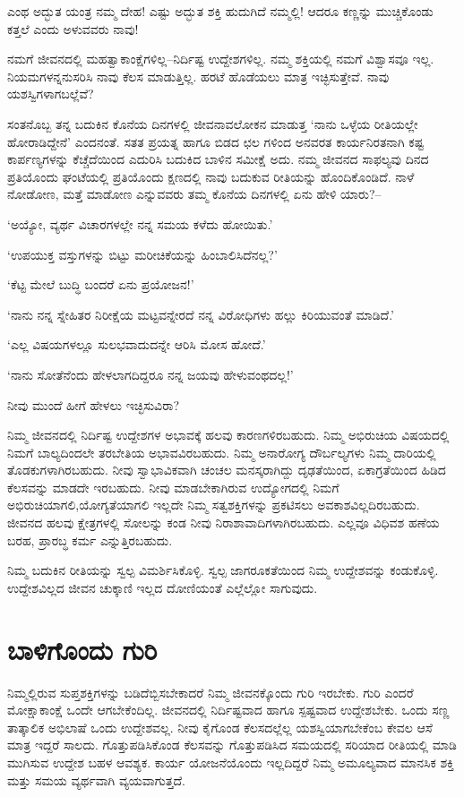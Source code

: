 ಎಂಥ ಅದ್ಭುತ ಯಂತ್ರ ನಮ್ಮ ದೇಹ! ಎಷ್ಟು ಅದ್ಭುತ ಶಕ್ತಿ ಹುದುಗಿದೆ ನಮ್ಮಲ್ಲಿ! ಆದರೂ ಕಣ್ಣನ್ನು ಮುಚ್ಚಿಕೊಂಡು ಕತ್ತಲೆ ಎಂದು ಅಳುವವರು ನಾವು!

ನಮಗೆ ಜೀವನದಲ್ಲಿ ಮಹತ್ವಾಕಾಂಕ್ಷೆಗಳಿಲ್ಲ–ನಿರ್ದಿಷ್ಟ ಉದ್ದೇಶಗಳಿಲ್ಲ. ನಮ್ಮ ಶಕ್ತಿಯಲ್ಲಿ ನಮಗೆ ವಿಶ್ವಾಸವೂ ಇಲ್ಲ. ನಿಯಮಗಳನ್ನನುಸರಿಸಿ ನಾವು ಕೆಲಸ ಮಾಡುತ್ತಿಲ್ಲ. ಹರಟೆ ಹೊಡೆಯಲು ಮಾತ್ರ ಇಚ್ಛಿಸುತ್ತೇವೆ. ನಾವು ಯಶಸ್ವಿಗಳಾಗಬಲ್ಲೆವೆ?

ಸಂತನೊಬ್ಬ ತನ್ನ ಬದುಕಿನ ಕೊನೆಯ ದಿನಗಳಲ್ಲಿ ಜೀವನಾವಲೋಕನ ಮಾಡುತ್ತ ‘ನಾನು ಒಳ್ಳೆಯ ರೀತಿಯಲ್ಲೇ ಹೋರಾಡಿದ್ದೇನೆ’ ಎಂದನಂತೆ. ಸತತ ಪ್ರಯತ್ನ ಹಾಗೂ ಬಿಡದ ಛಲ ಗಳಿಂದ ಅನವರತ ಕಾರ್ಯನಿರತನಾಗಿ ಕಷ್ಟ ಕಾರ್ಪಣ್ಯಗಳನ್ನು ಕೆಚ್ಚೆದೆಯಿಂದ ಎದುರಿಸಿ ಬದುಕಿದ ಬಾಳಿನ ಸಮೀಕ್ಷೆ ಅದು. ನಮ್ಮ ಜೀವನದ ಸಾಫಲ್ಯವು ದಿನದ ಪ್ರತಿಯೊಂದು ಘಂಟೆಯಲ್ಲಿ ಪ್ರತಿಯೊಂದು ಕ್ಷಣದಲ್ಲಿ ನಾವು ಬದುಕುವ ರೀತಿಯನ್ನು ಹೊಂದಿಕೊಂಡಿದೆ. ನಾಳೆ ನೋಡೋಣ, ಮತ್ತೆ ಮಾಡೋಣ ಎನ್ನುವವರು ತಮ್ಮ ಕೊನೆಯ ದಿನಗಳಲ್ಲಿ ಏನು ಹೇಳಿ ಯಾರು?–

‘ಅಯ್ಯೋ, ವ್ಯರ್ಥ ವಿಚಾರಗಳಲ್ಲೇ ನನ್ನ ಸಮಯ ಕಳೆದು ಹೋಯಿತು.’

‘ಉಪಯುಕ್ತ ವಸ್ತುಗಳನ್ನು ಬಿಟ್ಟು ಮರೀಚಿಕೆಯನ್ನು ಹಿಂಬಾಲಿಸಿದೆನಲ್ಲ?’

‘ಕೆಟ್ಟ ಮೇಲೆ ಬುದ್ಧಿ ಬಂದರೆ ಏನು ಪ್ರಯೋಜನ!’

‘ನಾನು ನನ್ನ ಸ್ನೇಹಿತರ ನಿರೀಕ್ಷೆಯ ಮಟ್ಟವನ್ನೇರದೆ ನನ್ನ ವಿರೋಧಿಗಳು ಹಲ್ಲು ಕಿರಿಯು\-ವಂತೆ ಮಾಡಿದೆ.’

‘ಎಲ್ಲ ವಿಷಯಗಳಲ್ಲೂ ಸುಲಭವಾದುದನ್ನೇ ಆರಿಸಿ ಮೋಸ ಹೋದೆ.’

‘ನಾನು ಸೋತೆನೆಂದು ಹೇಳಲಾಗದಿದ್ದರೂ ನನ್ನ ಜಯವು ಹೇಳುವಂಥದಲ್ಲ!’

ನೀವು ಮುಂದೆ ಹೀಗೆ ಹೇಳಲು ಇಚ್ಛಿಸುವಿರಾ?

ನಿಮ್ಮ ಜೀವನದಲ್ಲಿ ನಿರ್ದಿಷ್ಟ ಉದ್ದೇಶಗಳ ಅಭಾವಕ್ಕೆ ಹಲವು ಕಾರಣಗಳಿರಬಹುದು. ನಿಮ್ಮ ಅಭಿರುಚಿಯ ವಿಷಯದಲ್ಲಿ ನಿಮಗೆ ಬಾಲ್ಯದಿಂದಲೇ ತರಬೇತಿಯ ಅಭಾವವಿರಬಹುದು. ನಿಮ್ಮ ಅನಾರೋಗ್ಯ ದೌರ್ಬಲ್ಯಗಳು ನಿಮ್ಮ ದಾರಿಯಲ್ಲಿ ತೊಡಕುಗಳಾಗಿರಬಹುದು. ನೀವು ಸ್ವಾಭಾವಿಕವಾಗಿ ಚಂಚಲ ಮನಸ್ಕರಾಗಿದ್ದು ದೃಢತೆಯಿಂದ, ಏಕಾಗ್ರತೆಯಿಂದ ಹಿಡಿದ ಕೆಲಸವನ್ನು ಮಾಡದೇ ಇರಬಹುದು. ನೀವು ಮಾಡಬೇಕಾಗಿರುವ ಉದ್ಯೋಗದಲ್ಲಿ ನಿಮಗೆ ಅಭಿರುಚಿಯಾಗಲಿ,\break ಯೋಗ್ಯತೆಯಾಗಲಿ ಇಲ್ಲದೇ ನಿಮ್ಮ ಸತ್ವಶಕ್ತಿಗಳನ್ನು ಪ್ರಕಟಿಸಲು ಅವಕಾಶವಿಲ್ಲದಿರಬಹುದು. ಜೀವನದ ಹಲವು ಕ್ಷೇತ್ರಗಳಲ್ಲಿ ಸೋಲನ್ನು ಕಂಡ ನೀವು ನಿರಾಶಾವಾದಿಗಳಾಗಿರಬಹುದು. ಎಲ್ಲವೂ ವಿಧಿವಶ ಹಣೆಯ ಬರಹ, ಪ್ರಾರಬ್ಧ ಕರ್ಮ ಎನ್ನುತ್ತಿರಬಹುದು.

ನಿಮ್ಮ ಬದುಕಿನ ರೀತಿಯನ್ನು ಸ್ವಲ್ಪ ವಿಮರ್ಶಿಸಿಕೊಳ್ಳಿ. ಸ್ವಲ್ಪ ಜಾಗರೂಕತೆಯಿಂದ ನಿಮ್ಮ ಉದ್ದೇಶವನ್ನು ಕಂಡುಕೊಳ್ಳಿ. ಉದ್ದೇಶವಿಲ್ಲದ ಜೀವನ ಚುಕ್ಕಾಣಿ ಇಲ್ಲದ ದೋಣಿಯಂತೆ ಎಲ್ಲೆಲ್ಲೋ ಸಾಗುವುದು.


\section*{ಬಾಳಿಗೊಂದು ಗುರಿ}


ನಿಮ್ಮಲ್ಲಿರುವ ಸುಪ್ತಶಕ್ತಿಗಳನ್ನು ಬಡಿದೆಬ್ಬಿಸಬೇಕಾದರೆ ನಿಮ್ಮ ಜೀವನಕ್ಕೊಂದು ಗುರಿ ಇರಬೇಕು. ಗುರಿ ಎಂದರೆ ಮೋಕ್ಷಾಕಾಂಕ್ಷೆ ಒಂದೇ ಆಗಬೇಕೆಂದಿಲ್ಲ. ಜೀವನದಲ್ಲಿ ನಿರ್ದಿಷ್ಟವಾದ ಹಾಗೂ ಸ್ಪಷ್ಟವಾದ ಉದ್ದೇಶಬೇಕು. ಒಂದು ಸಣ್ಣ ತಾತ್ಕಾಲಿಕ ಅಭಿಲಾಷೆ ಒಂದು ಉದ್ದೇಶವಲ್ಲ. ನೀವು ಕೈಗೊಂಡ ಕೆಲಸದಲ್ಲೆಲ್ಲ ಯಶಸ್ವಿಯಾಗಬೇಕೆಂಬ ಕೇವಲ ಆಸೆ ಮಾತ್ರ ಇದ್ದರೆ ಸಾಲದು. ಗೊತ್ತು\-ಪಡಿಸಿ\-ಕೊಂಡ ಕೆಲಸವನ್ನು ಗೊತ್ತುಪಡಿಸಿದ ಸಮಯದಲ್ಲಿ ಸರಿಯಾದ ರೀತಿಯಲ್ಲಿ ಮಾಡಿ ಮುಗಿ\-ಸುವ ಉದ್ದೇಶ ಬಹಳ ಆವಶ್ಯಕ. ಕಾರ್ಯ ಯೋಜನೆಯೊಂದು ಇಲ್ಲದಿದ್ದರೆ ನಿಮ್ಮ ಅಮೂಲ್ಯವಾದ ಮಾನಸಿಕ ಶಕ್ತಿ ಮತ್ತು ಸಮಯ ವ್ಯರ್ಥವಾಗಿ ವ್ಯಯವಾಗುತ್ತದೆ.

